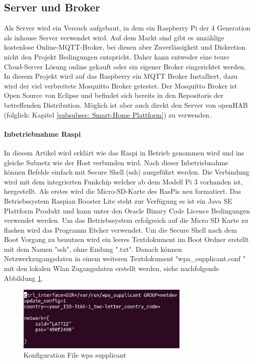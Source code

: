 \subsection{Server und Broker}\label{subsec: Server}
Als Server wird ein Versuch aufgebaut, in dem ein Raspberry Pi  der 4 Generation als inhouse Server verwendet wird. Auf dem Markt sind gibt es unzählige kostenlose Online-MQTT-Broker, bei diesen aber Zuverlässigkeit und Diskretion nicht den Projekt Bedingungen entspricht. Daher kann entweder eine teure Cloud-Server Lösung online gekauft oder ein eigener Broker eingerichtet werden. In diesem Projekt wird auf das Raspberry ein MQTT Broker Installiert, dazu wird der viel verbreitete Mosquitto Broker getestet. Der Mosquitto Broker ist Open Source von Eclipse und befindet sich bereits in den Repositoris der betreffenden Distribution. Möglich ist aber auch direkt den Server von openHAB (folglich: Kapitel \ref{subsubsec: Smart-Home Plattform}) zu verwenden.
\paragraph{Inbetriebnahme Raspi}
In diesem Artikel wird erklärt wie das Raspi in Betrieb genommen wird und ins gleiche Subnetz wie der Host verbunden wird. Nach dieser Inbetriebnahme können Befehle einfach mit Secure Shell (ssh) ausgeführt werden. Die Verbindung wird mit dem integrierten Funkchip welcher ab dem Modell Pi 3 vorhanden ist, hergestellt.
Als erstes wird die Micro-SD-Karte des RasPis neu formatiert. Das Betriebssystem Raspian Booster Lite steht \cite{noauthor_download_nodate} zur Verfügung es ist ein Java SE Plattform Produkt und kann unter den Oracle Binary Code Licence Bedingungen verwendet werden. Um das Betriebssystem erfolgreich auf die Micro SD Karte zu flashen wird das Programm Etcher \cite{noauthor_balenaetcher_nodate} verwendet. Um die Secure Shell nach dem Boot Vorgang zu benutzen wird ein leeres Textdokument im Boot Ordner erstellt mit dem Namen "ssh", ohne Endung ".txt". Danach können Netzwerkzugangsdaten in einem weiteren Textdokument "wpa\_supplicant.conf " mit den lokalen Wlan Zugangsdaten erstellt werden, siehe nachfolgende Abbildung \ref{pic: wpasupplicant}. 

\begin{figure}[H]
	\centering
	\includegraphics[width=0.75\textwidth]{graphics/WPAsupplicant.png}
	\caption{Konfiguration File wpa supplicant}
	\label{pic: wpasupplicant}
\end{figure}

